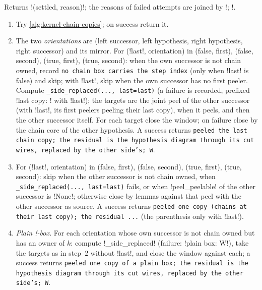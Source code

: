 \begin{algorithm}\label{alg:kernel-chain-window}
Returns \py!(settled, reason)!; the reasons of failed attempts are joined by \code!; !.
\begin{enumerate}
\item Try \cref{alg:kernel-chain-copies}; on success return it.
\item The two \emph{orientations} are (left successor, left hypothesis, right hypothesis, right successor) and its mirror. For (\code!last!, orientation) in (false, first), (false, second), (true, first), (true, second): when the own successor is not chain owned, record \texttt{no chain box carries the step index} (only when \code!last! is false) and skip; with \code!last!, skip when the own successor has no first peeler. Compute \texttt{\_\allowbreak{}side\_\allowbreak{}replaced(\allowbreak{}.\allowbreak{}.\allowbreak{}.\allowbreak{},\allowbreak{} last=last)} (a failure is recorded, prefixed \code!last copy: ! with \code!last!); the targets are the joint peel of the other successor (with \code!last!, its first peelers peeling their last copy), when it peels, and then the other successor itself. For each target close the window; on failure close by the chain core of the other hypothesis. A success returns \texttt{peeled the last chain copy; the residual is the hypothesis diagram through its cut wires,\allowbreak{} replaced by the other side's; W}.
\item For (\code!last!, orientation) in (false, first), (false, second), (true, first), (true, second): skip when the other successor is not chain owned, when \texttt{\_\allowbreak{}side\_\allowbreak{}replaced(\allowbreak{}.\allowbreak{}.\allowbreak{}.\allowbreak{},\allowbreak{} last=last)} fails, or when \py!peel_peelable! of the other successor is \py!None!; otherwise close by lemmas against that peel with the other successor as source. A success returns \texttt{peeled one copy (\allowbreak{}chains at their last copy); the residual .\allowbreak{}.\allowbreak{}.\allowbreak{}} (the parenthesis only with \code!last!).
\item \emph{Plain !-box.} For each orientation whose own successor is not chain owned but has an owner of $k$: compute \py!_side_replaced! (failure: \code!plain box: W!), take the targets as in step~2 without \code!last!, and close the window against each; a success returns \texttt{peeled one copy of a plain box; the residual is the hypothesis diagram through its cut wires,\allowbreak{} replaced by the other side's; W}.

\end{enumerate}
\end{algorithm}
